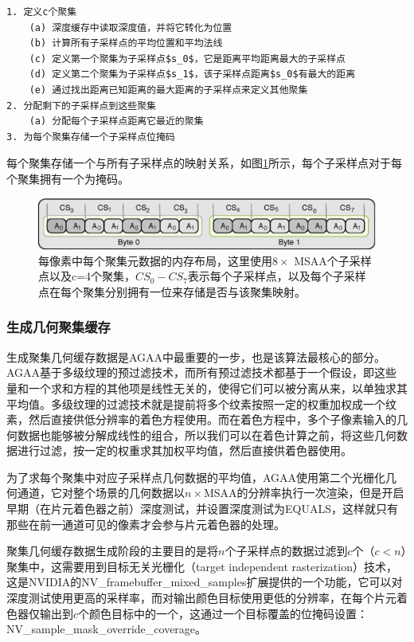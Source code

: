 \begin{lstlisting}[mathescape=true]
1. 定义c个聚集
	(a) 深度缓存中读取深度值，并将它转化为位置
	(b) 计算所有子采样点的平均位置和平均法线
	(c) 定义第一个聚集为子采样点$s_0$，它是距离平均距离最大的子采样点
	(d) 定义第二个聚集为子采样点$s_1$，该子采样点距离$s_0$有最大的距离
	(e) 通过找出距离已知距离的最大距离的子采样点来定义其他聚集
2. 分配剩下的子采样点到这些聚集
	(a) 分配每个子采样点距离它最近的聚集
3. 为每个聚集存储一个子采样点位掩码
\end{lstlisting}

每个聚集存储一个与所有子采样点的映射关系，如图\ref{f:shade-aggregate-mask}所示，每个子采样点对于每个聚集拥有一个为掩码。

\begin{figure}
	\includegraphics[width=\textwidth]{figures/shade/aggregate-mask}
	\caption{每像素中每个聚集元数据的内存布局，这里使用$8\times$ MSAA个子采样点以及c=4个聚集，$CS_0-CS_7$表示每个子采样点，以及每个子采样点在每个聚集分别拥有一位来存储是否与该聚集映射。}
	\label{f:shade-aggregate-mask}
\end{figure}




\subsubsection{生成几何聚集缓存}
生成聚集几何缓存数据是AGAA中最重要的一步，也是该算法最核心的部分。AGAA基于多级纹理的预过滤技术，而所有预过滤技术都基于一个假设，即这些量和一个求和方程的其他项是线性无关的，使得它们可以被分离从来，以单独求其平均值。多级纹理的过滤技术就是提前将多个纹素按照一定的权重加权成一个纹素，然后直接供低分辨率的着色方程使用。而在着色方程中，多个子像素输入的几何数据也能够被分解成线性的组合，所以我们可以在着色计算之前，将这些几何数据进行过滤，按一定的权重求其加权平均值，然后直接供着色器使用。

为了求每个聚集中对应子采样点几何数据的平均值，AGAA使用第二个光栅化几何通道，它对整个场景的几何数据以$n\times$MSAA的分辨率执行一次渲染，但是开启早期（在片元着色器之前）深度测试，并设置深度测试为EQUALS，这样就只有那些在前一通道可见的像素才会参与片元着色器的处理。

聚集几何缓存数据生成阶段的主要目的是将$n$个子采样点的数据过滤到$c$个（$c<n$）聚集中，这需要用到目标无关光栅化（target independent rasterization）技术，这是NVIDIA的NV\_framebuffer\_mixed\_samples扩展\cite{a:NVIDIAOpenGLExtensionsSpecifications}提供的一个功能，它可以对深度测试使用更高的采样率，而对输出颜色目标使用更低的分辨率，在每个片元着色器仅输出到$c$个颜色目标中的一个，这通过一个目标覆盖的位掩码设置：NV\_sample\_mask\_override\_coverage。

